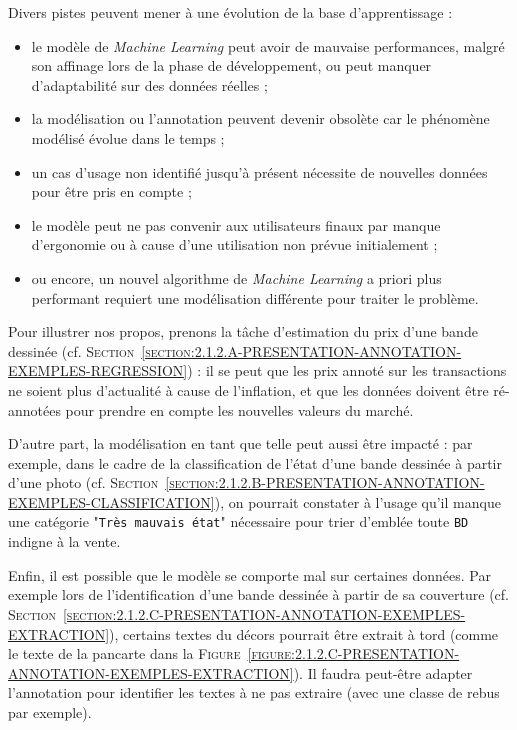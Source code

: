 			Divers pistes peuvent mener à une évolution de la base d'apprentissage :
			\begin{itemize}
				\item le modèle de \textit{Machine Learning} peut avoir de mauvaise performances, malgré son affinage lors de la phase de développement, ou peut manquer d'adaptabilité sur des données réelles ;
				\item la modélisation ou l'annotation peuvent devenir obsolète car le phénomène modélisé évolue dans le temps ;
				\item un cas d'usage non identifié jusqu'à présent nécessite de nouvelles données pour être pris en compte ;
				\item le modèle peut ne pas convenir aux utilisateurs finaux par manque d'ergonomie ou à cause d'une utilisation non prévue initialement ;
				\item ou encore, un nouvel algorithme de \textit{Machine Learning} a priori plus performant requiert une modélisation différente pour traiter le problème.
			\end{itemize}
			\begin{leftBarExamples}
				Pour illustrer nos propos, prenons la tâche d'estimation du prix d'une bande dessinée (cf. \textsc{Section~\ref{section:2.1.2.A-PRESENTATION-ANNOTATION-EXEMPLES-REGRESSION}}) : il se peut que les prix annoté sur les transactions ne soient plus d'actualité à cause de l'inflation, et que les données doivent être ré-annotées pour prendre en compte les nouvelles valeurs du marché.
				
				D'autre part, la modélisation en tant que telle peut aussi être impacté : par exemple, dans le cadre de la classification de l'état d'une bande dessinée à partir d'une photo (cf. \textsc{Section~\ref{section:2.1.2.B-PRESENTATION-ANNOTATION-EXEMPLES-CLASSIFICATION}}), on pourrait constater à l'usage qu'il manque une catégorie "\texttt{Très mauvais état}" nécessaire pour trier d’emblée toute \texttt{BD} indigne à la vente.
				
				Enfin, il est possible que le modèle se comporte mal sur certaines données.
				Par exemple lors de l'identification d'une bande dessinée à partir de sa couverture (cf. \textsc{Section~\ref{section:2.1.2.C-PRESENTATION-ANNOTATION-EXEMPLES-EXTRACTION}}), certains textes du décors pourrait être extrait à tord (comme le texte de la pancarte  dans la \textsc{Figure~\ref{figure:2.1.2.C-PRESENTATION-ANNOTATION-EXEMPLES-EXTRACTION}}).
				Il faudra peut-être adapter l'annotation pour identifier les textes à ne pas extraire (avec une classe de rebus par exemple).
			\end{leftBarExamples}
			
